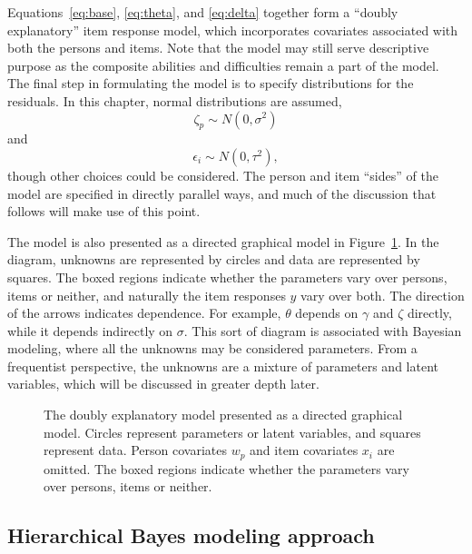 \documentclass[12pt, letterpaper]{article}
\begin{document}
Equations~\ref{eq:base}, \ref{eq:theta}, and \ref{eq:delta} together form a ``doubly explanatory'' item response model, which incorporates covariates associated with both the persons and items. Note that the model may still serve descriptive purpose as the composite abilities and difficulties remain a part of the model. The final step in formulating the model is to specify distributions for the residuals. In this chapter, normal distributions are assumed,
\begin{equation}
	\zeta_p \sim N(0, \sigma^2)
\end{equation}
and
\begin{equation}
	\epsilon_i \sim N(0, \tau^2)
,\end{equation}
though other choices could be considered. The person and item ``sides'' of the model are specified in directly parallel ways, and much of the discussion that follows will make use of this point.

The model is also presented as a directed graphical model \parencite[for example,][]{dawid1999probabilistic, jordan2004graphical} in Figure~\ref{fig:eirm-model}. In the diagram, unknowns are represented by circles and data are represented by squares. The boxed regions indicate whether the parameters vary over persons, items or neither, and naturally the item responses $y$ vary over both. The direction of the arrows indicates dependence. For example, $\theta$ depends on $\gamma$ and $\zeta$ directly, while it depends indirectly on $\sigma$. This sort of diagram is associated with Bayesian modeling, where all the unknowns may be considered parameters. From a frequentist perspective, the unknowns are a mixture of parameters and latent variables, which will be discussed in greater depth later.

\begin{figure}[btp]
	\centering
	
	\caption[The doubly explanatory model]
	{The doubly explanatory model presented as a directed graphical model. Circles represent parameters or latent variables, and squares represent data. Person covariates $w_p$ and item covariates $x_i$ are omitted. The boxed regions indicate whether the parameters vary over persons, items or neither.}
	\label{fig:eirm-model}
\end{figure}


\subsection{Hierarchical Bayes modeling approach}
\end{document}
